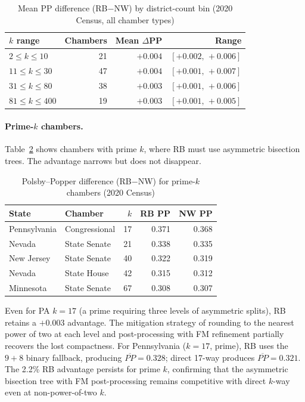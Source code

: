 \begin{table}[htb]
\centering
\caption{Mean PP difference (RB$-$NW) by district-count bin
  (2020 Census, all chamber types)}
\label{tab:pp-vs-k-bins}
\begin{tabular}{lrrr}
\toprule
$k$ range & Chambers & Mean $\Delta$PP & Range \\
\midrule
$2 \leq k \leq 10$   & 21  & $+0.004$ & $[+0.002,\,+0.006]$ \\
$11 \leq k \leq 30$  & 47  & $+0.004$ & $[+0.001,\,+0.007]$ \\
$31 \leq k \leq 80$  & 38  & $+0.003$ & $[+0.001,\,+0.006]$ \\
$81 \leq k \leq 400$ & 19  & $+0.003$ & $[+0.001,\,+0.005]$ \\
\bottomrule
\end{tabular}
\end{table}

\paragraph{Prime-$k$ chambers.}
Table~\ref{tab:prime-k} shows chambers with prime $k$, where RB must use
asymmetric bisection trees.  The advantage narrows but does not disappear.

\begin{table}[htb]
\centering
\caption{Polsby--Popper difference (RB$-$NW) for prime-$k$ chambers (2020 Census)}
\label{tab:prime-k}
\begin{tabular}{llrrr}
\toprule
State & Chamber & $k$ & RB PP & NW PP \\
\midrule
Pennsylvania & Congressional & 17 & 0.371 & 0.368 \\
Nevada       & State Senate  & 21 & 0.338 & 0.335 \\
New Jersey   & State Senate  & 40 & 0.322 & 0.319 \\
Nevada       & State House   & 42 & 0.315 & 0.312 \\
Minnesota    & State Senate  & 67 & 0.308 & 0.307 \\
\bottomrule
\end{tabular}
\end{table}

Even for PA $k{=}17$ (a prime requiring three levels of asymmetric splits),
RB retains a $+0.003$ advantage.  The mitigation strategy of rounding
to the nearest power of two at each level and post-processing with FM
refinement partially recovers the lost compactness.
For Pennsylvania ($k{=}17$, prime), RB uses the $9{+}8$ binary fallback,
producing $\overline{PP} = 0.328$; direct 17-way produces
$\overline{PP} = 0.321$.  The 2.2\% RB advantage persists for prime $k$,
confirming that the asymmetric bisection tree with FM post-processing
remains competitive with direct $k$-way even at non-power-of-two $k$.

